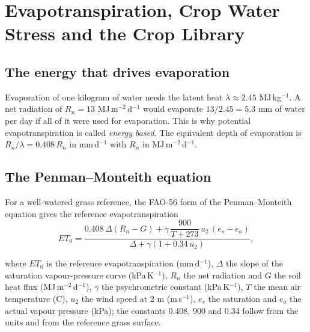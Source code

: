 \chapter{Evapotranspiration, Crop Water Stress and the Crop Library}\label{chap:05}
\section{The energy that drives evaporation}
Evaporation of one kilogram of water needs the latent heat $\lambda\approx2.45$ MJ\,kg$^{-1}$. A net radiation of $R_n=13$ MJ\,m$^{-2}$\,d$^{-1}$ would evaporate $13/2.45=5.3$ mm of water per day if all of it were used for evaporation. This is why potential evapotranspiration is called \emph{energy based}. The equivalent depth of evaporation is $R_n/\lambda=0.408\,R_n$ in mm\,d$^{-1}$ with $R_n$ in MJ\,m$^{-2}$\,d$^{-1}$.

\section{The Penman--Monteith equation}
For a well-watered grass reference, the FAO-56 form of the Penman--Monteith equation gives the reference evapotranspiration
\begin{equation}\label{eq:pm}\boxed{ET_0=\frac{0.408\,\Delta(R_n-G)+\gamma\,\dfrac{900}{T+273}\,u_2\,(e_s-e_a)}{\Delta+\gamma(1+0.34\,u_2)},}\end{equation}
\par\noindent where $ET_0$ is the reference evapotranspiration (mm\,d$^{-1}$), $\Delta$ the slope of the saturation vapour-pressure curve (kPa\,K$^{-1}$), $R_n$ the net radiation and $G$ the soil heat flux (MJ\,m$^{-2}$\,d$^{-1}$), $\gamma$ the psychrometric constant (kPa\,K$^{-1}$), $T$ the mean air temperature (\textdegree C), $u_2$ the wind speed at 2 m (m\,s$^{-1}$), $e_s$ the saturation and $e_a$ the actual vapour pressure (kPa); the constants 0.408, 900 and 0.34 follow from the units and from the reference grass surface.

